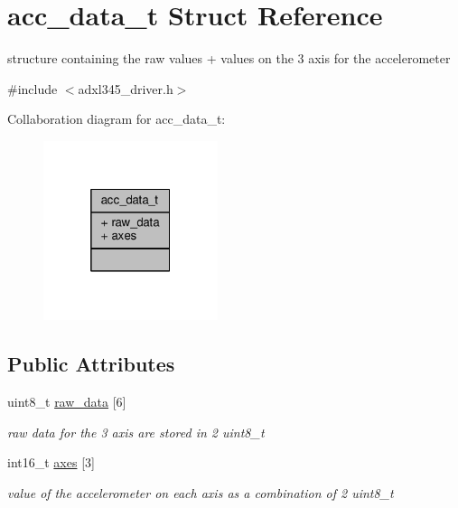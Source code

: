 \hypertarget{structacc__data__t}{\section{acc\+\_\+data\+\_\+t Struct Reference}
\label{structacc__data__t}
}


structure containing the raw values + values on the 3 axis for the accelerometer  




{\ttfamily \#include $<$adxl345\+\_\+driver.\+h$>$}



Collaboration diagram for acc\+\_\+data\+\_\+t\+:
\nopagebreak
\begin{figure}[H]
\begin{center}
\leavevmode
\includegraphics[width=145pt]{structacc__data__t__coll__graph}
\end{center}
\end{figure}
\subsection*{Public Attributes}
\begin{DoxyCompactItemize}
\item 
\hypertarget{structacc__data__t_ae7bfdb58b0497384ec2b9f9b38877804}{uint8\+\_\+t \hyperlink{structacc__data__t_ae7bfdb58b0497384ec2b9f9b38877804}{raw\+\_\+data} \mbox{[}6\mbox{]}}\label{structacc__data__t_ae7bfdb58b0497384ec2b9f9b38877804}

\begin{DoxyCompactList}\small\item\em raw data for the 3 axis are stored in 2 uint8\+\_\+t \end{DoxyCompactList}\item 
\hypertarget{structacc__data__t_aa2d8b2f39f7dda769ffee23a03050a58}{int16\+\_\+t \hyperlink{structacc__data__t_aa2d8b2f39f7dda769ffee23a03050a58}{axes} \mbox{[}3\mbox{]}}\label{structacc__data__t_aa2d8b2f39f7dda769ffee23a03050a58}

\begin{DoxyCompactList}\small\item\em value of the accelerometer on each axis as a combination of 2 uint8\+\_\+t \end{DoxyCompactList}\end{DoxyCompactItemize}



